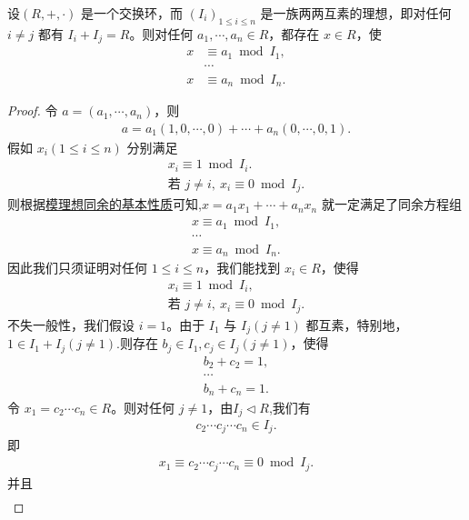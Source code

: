 \documentclass[../../main.tex]{subfiles}
\begin{document}
\begin{theorem}[中国剩余定理]\label{theorem:中国剩余定理}
设$(R, +, \cdot)$ 是一个交换环，而 $(I_i)_{1 \leqslant i \leqslant n}$ 是一族两两互素的理想，即对任何 $i \neq j$ 都有 $I_i + I_j = R$。则对任何 $a_1, \cdots, a_n \in R$，都存在 $x \in R$，使
\begin{align*}
x &\equiv a_1 \bmod I_1 ,\\
&\cdots \\
x &\equiv a_n \bmod I_n .
\end{align*}
\end{theorem}
\begin{proof}
令 $a = (a_1, \cdots, a_n)$，则
\begin{align*}
a = a_1(1, 0, \cdots, 0) + \cdots + a_n(0, \cdots, 0, 1) .
\end{align*}
假如 $x_i (1 \leqslant i \leqslant n)$ 分别满足
\begin{gather*}
x_i \equiv 1 \bmod I_i.\\
\text{若 } j \neq i, \ x_i \equiv 0 \bmod I_j .
\end{gather*}
则根据\hyperref[proposition:模理想同余的基本性质]{模理想同余的基本性质}可知,$x = a_1 x_1 + \cdots + a_n x_n$ 就一定满足了同余方程组
\begin{gather*}
x \equiv a_1 \bmod I_1 ,\\
\cdots \\
x \equiv a_n \bmod I_n .
\end{gather*}
因此我们只须证明对任何 $1 \leqslant i \leqslant n$，我们能找到 $x_i \in R$，使得
\begin{gather*}
x_i \equiv 1 \bmod I_i,\\
\text{若 } j \neq i, \ x_i \equiv 0 \bmod I_j .
\end{gather*}
不失一般性，我们假设 $i = 1$。由于 $I_1$ 与 $I_j (j \neq 1)$ 都互素，特别地，$1\in I_1+I_j(j\ne 1)$.则存在 $b_j \in I_1, c_j \in I_j (j \neq 1)$，使得
\begin{gather*}
b_2 + c_2 = 1 ,\\
\cdots \\
b_n + c_n = 1 .
\end{gather*}
令 $x_1 = c_2 \cdots c_n \in R$。则对任何 $j \neq 1$，由$I_j\lhd R$,我们有
\begin{align*}
c_2 \cdots c_j \cdots c_n \in I_j.
\end{align*}
即
\begin{align*}
x_1 \equiv c_2 \cdots c_j \cdots c_n \equiv 0 \bmod I_j.
\end{align*}
并且
\begin{align*}

\end{align*}
\end{proof}
\end{document}
